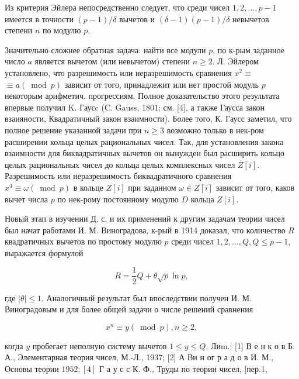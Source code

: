 \documentclass[10pt]{article}
\begin{document}
Из критерия Эйлера непосредственно следует, что среди чисел $1,2, \ldots, p-1$ имеется в точности $(p-1) / \delta$ вычетов и $(\delta-1)(p-1) / \delta$ невычетов степени $n$ по модулю $p$.



Значительно сложнее обратная задача: найти все модули $p$, по к-рым заданное число $a$ является вычетом (или невычетом) степени $n \geqslant 2$. Л. Эйлером установлено, что разрешимость или неразрешимость сравнения $x^{2} \equiv$ $\equiv a(\bmod p)$ зависит от того, принадлежит или нет простой модуль $p$ некоторым арифметич. прогрессиям. Полное доказательство этого результата впервые получил K. Гаусc (C. Gauss, 1801; см. [4], а также Гаусса закон взаияности, Квадратичный закон взаимности). Более того, К. Гаусс заметил, что полное решение указанной задачи при $n \geqslant 3$ возможно только в нек-ром расширении кольца целых рациональных чисел. Так, для установления закона взаимности для биквадратичных вычетов он вынужден был расширить кольцо целых рациональных чисел до кольца целых комплексных чисел $Z[i]$. Разрешимость или неразрешимость биквадратичного сравнения $x^{4} \equiv \omega(\bmod p)$ в кольце $Z[i]$ при заданном $\omega \in Z[i]$ зависит от того, каков вычет числа $p$ по нек-рому постоянному модулю $D$ кольца $Z[i]$.



Новый этап в изучении Д. с. и их применений к другим задачам теории чисел был начат работами И. М. Виноградова, к-рый в 1914 доказал, что количество $R$ квадратичных вычетов по простому модулю $p$ среди чисел $1,2, \ldots, Q, Q \leqslant p-1$, выражается формулой



\[

R=\frac{1}{2} Q+\theta \sqrt{p} \ln p,

\]



где $|\theta| \leqslant 1$. Аналогичный результат был впоследствии получен И. М. Виноградовым и для более общей задачи о числе решений сравнения



\[

x^{n} \equiv y(\bmod p), n \geqslant 2,

\]



когда $y$ пробегает неполную систему вычетов $1 \leqslant y \leqslant Q$. Лиm.: [1] В е н к о в Б. А., Элементарная теория чисел, М.-Л., 1937; [2] А Ви н ог р а д о в И. М., Основы теории $1952 ;[4]$ Г а у с с К. Ф., Труды по теории чисел, [пер.1,
\end{document}
